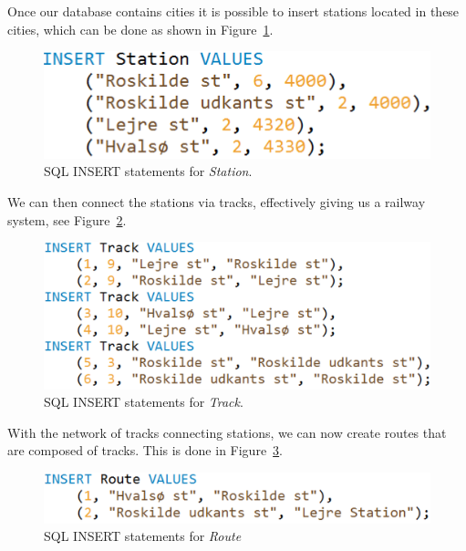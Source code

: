 Once our database contains cities it is possible to insert stations located in 
these cities, which can be done as shown in Figure~\ref{fig:ins:station}.

\begin{figure}[h]
    \centering
    \includegraphics[scale=.5]{img/INSERT_Statement_Station}
    \caption{SQL INSERT statements for \emph{Station}.}
    \label{fig:ins:station}
\end{figure}

We can then connect the stations via tracks, effectively giving us a railway 
system, see Figure~\ref{fig:ins:track}.

\begin{figure}[h]
    \centering
    \includegraphics[scale=.5]{img/INSERT_Statements_Track}
    \caption{SQL INSERT statements for \emph{Track}.}
    \label{fig:ins:track}
\end{figure}

With the network of tracks connecting stations, we can now create routes that 
are composed of tracks. This is done in Figure~\ref{fig:ins:route}.

\begin{figure}[h]
    \centering
    \includegraphics[scale=.5]{img/INSERT_Statements_Route}
    \caption{SQL INSERT statements for \emph{Route}}
    \label{fig:ins:route}
\end{figure}

